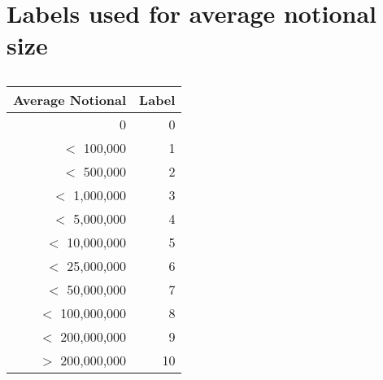 \chapter{Labels used for average notional size}\label{AppD}

\begin{table}[!ht]\centering
    \caption{}\label{AppTab:1}
    \begin{tabular}{rr}
        \toprule
            Average Notional  & Label \\
        \midrule
                            0 &  0   \\
            $<$       100,000 &  1   \\
            $<$       500,000 &  2   \\
            $<$     1,000,000 &  3   \\
            $<$     5,000,000 &  4   \\
            $<$    10,000,000 &  5   \\
            $<$    25,000,000 &  6   \\
            $<$    50,000,000 &  7   \\
            $<$   100,000,000 &  8   \\
            $<$   200,000,000 &  9   \\
            $>$   200,000,000 & 10   \\
        \bottomrule
    \end{tabular}
\end{table}
